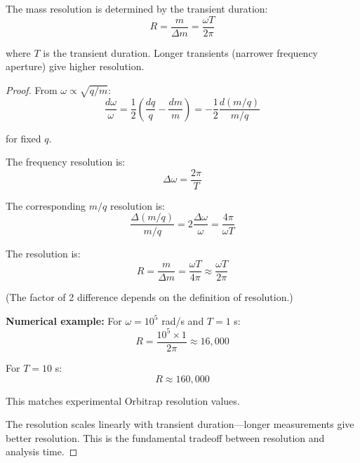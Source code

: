 \begin{corollary}
\label{cor:orbitrap_resolution}
The mass resolution is determined by the transient duration:
\begin{equation}
R = \frac{m}{\Delta m} = \frac{\omega T}{2\pi}
\end{equation}

where $T$ is the transient duration. Longer transients (narrower frequency aperture) give higher resolution.
\end{corollary}

\begin{proof}
From $\omega \propto \sqrt{q/m}$:
\begin{equation}
\frac{d\omega}{\omega} = \frac{1}{2}\left(\frac{dq}{q} - \frac{dm}{m}\right) = -\frac{1}{2}\frac{d(m/q)}{m/q}
\end{equation}

for fixed $q$.

The frequency resolution is:
\begin{equation}
\Delta\omega = \frac{2\pi}{T}
\end{equation}

The corresponding $m/q$ resolution is:
\begin{equation}
\frac{\Delta(m/q)}{m/q} = 2\frac{\Delta\omega}{\omega} = \frac{4\pi}{\omega T}
\end{equation}

The resolution is:
\begin{equation}
R = \frac{m}{\Delta m} = \frac{\omega T}{4\pi} \approx \frac{\omega T}{2\pi}
\end{equation}

(The factor of 2 difference depends on the definition of resolution.)

\textbf{Numerical example:} For $\omega = 10^5$ rad/s and $T = 1$ s:
\begin{equation}
R = \frac{10^5 \times 1}{2\pi} \approx 16,000
\end{equation}

For $T = 10$ s:
\begin{equation}
R \approx 160,000
\end{equation}

This matches experimental Orbitrap resolution values.

The resolution scales linearly with transient duration—longer measurements give better resolution. This is the fundamental tradeoff between resolution and analysis time.
\end{proof}

